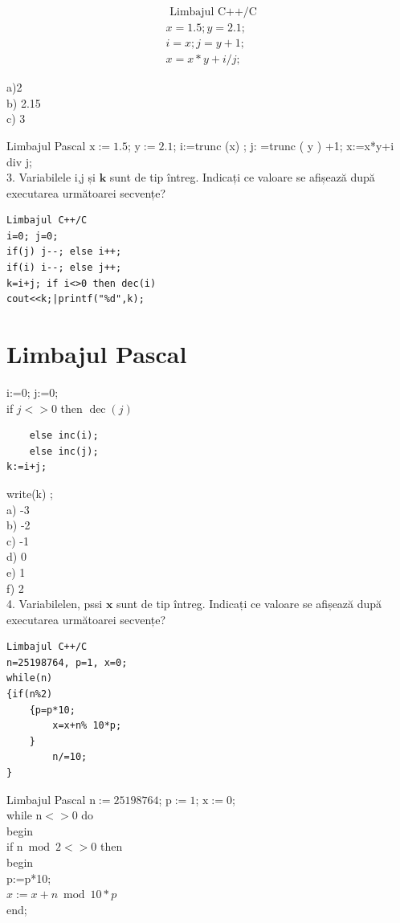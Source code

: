 \documentclass[10pt]{article}
\begin{document}
$$
\begin{aligned}
& \text { Limbajul C++/C } \\
& x=1.5 ; y=2.1 ; \\
& i=x ; j=y+1 ; \\
& x=x * y+i / j ;
\end{aligned}
$$

a)2\\
b) 2.15\\
c) 3

Limbajul Pascal $\mathrm{x}:=1.5$; $\mathrm{y}:=2.1$; i:=trunc (x) ; j: =trunc ( y ) +1; x:=x*y+i div j;\\
3. Variabilele i,j și $\mathbf{k}$ sunt de tip întreg. Indicați ce valoare se afișează după executarea următoarei secvențe?

\begin{verbatim}
Limbajul C++/C
i=0; j=0;
if(j) j--; else i++;
if(i) i--; else j++;
k=i+j; if i<>0 then dec(i)
cout<<k;|printf("%d",k);
\end{verbatim}

\section*{Limbajul Pascal}
i:=0; j:=0;\\
if $j<>0$ then $\operatorname{dec}(j)$

\begin{verbatim}
    else inc(i);
    else inc(j);
k:=i+j;
\end{verbatim}

write(k) ;\\
a) -3\\
b) -2\\
c) -1\\
d) 0\\
e) 1\\
f) 2\\
4. Variabilelen, pssi $\mathbf{x}$ sunt de tip întreg. Indicați ce valoare se afișează după executarea următoarei secvențe?

\begin{verbatim}
Limbajul C++/C
n=25198764, p=1, x=0;
while(n)
{if(n%2)
    {p=p*10;
        x=x+n% 10*p;
    }
        n/=10;
}
\end{verbatim}

Limbajul Pascal $\mathrm{n}:=25198764$; $\mathrm{p}:=1$; $\mathrm{x}:=0$;\\
while $\mathrm{n}<>0$ do\\
begin\\
if $\mathrm{n} \bmod 2<>0$ then\\
begin\\
p:=p*10;\\
$x:=x+n \bmod 10 * p$\\
end;
\end{document}
